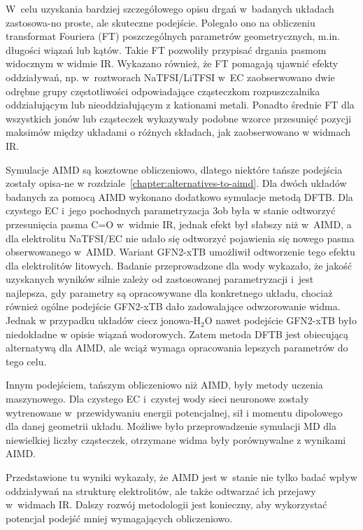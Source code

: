 W~celu uzyskania bardziej szczegółowego opisu drgań w~badanych układach zastosowa-no proste, ale skuteczne podejście. Polegało ono na obliczeniu transformat Fouriera (FT) poszczególnych parametrów geometrycznych, m.in. długości wiązań lub kątów. Takie FT pozwoliły przypisać drgania pasmom widocznym w widmie IR. Wykazano również, że FT pomagają ujawnić efekty oddziaływań, np. w~roztworach NaTFSI/LiTFSI w~EC zaobserwowano dwie odrębne grupy częstotliwości odpowiadające cząsteczkom rozpuszczalnika oddziałującym lub nieoddziałującym z kationami metali. Ponadto średnie FT dla wszystkich jonów lub cząsteczek wykazywały podobne wzorce przesunięć pozycji maksimów między układami o różnych składach, jak zaobserwowano w widmach IR.

Symulacje AIMD są kosztowne obliczeniowo, dlatego niektóre tańsze podejścia zostały opisa-ne w rozdziale~\ref{chapter:alternatives-to-aimd}. Dla dwóch układów badanych za pomocą AIMD wykonano dodatkowo symulacje metodą DFTB. Dla czystego EC i~jego pochodnych parametryzacja 3ob była w stanie odtworzyć przesunięcia pasma C=O w~widmie IR, jednak efekt był słabszy niż w~AIMD, a dla elektrolitu NaTFSI/EC nie udało się odtworzyć pojawienia się nowego pasma obserwowanego w~AIMD. Wariant GFN2-xTB umożliwił odtworzenie tego efektu dla elektrolitów litowych. Badanie przeprowadzone dla wody wykazało, że jakość uzyskanych wyników silnie zależy od zastosowanej parametryzacji i~jest najlepsza, gdy parametry są opracowywane dla konkretnego układu, chociaż również ogólne podejście GFN2-xTB dało zadowalające odwzorowanie widma. Jednak w przypadku układów ciecz jonowa-H$_2$O nawet podejście GFN2-xTB było niedokładne w opisie wiązań wodorowych. Zatem metoda DFTB jest obiecującą alternatywą dla AIMD, ale wciąż wymaga opracowania lepszych parametrów do tego celu.

Innym podejściem, tańszym obliczeniowo niż AIMD, były metody uczenia maszynowego. Dla czystego EC i~czystej wody sieci neuronowe zostały wytrenowane w~przewidywaniu energii potencjalnej, sił i momentu dipolowego dla danej geometrii układu. Możliwe było przeprowadzenie symulacji MD dla niewielkiej liczby cząsteczek, otrzymane widma były porównywalne z wynikami AIMD.

Przedstawione tu wyniki wykazały, że AIMD jest w~stanie nie tylko badać wpływ oddziaływań na strukturę elektrolitów, ale także odtwarzać ich przejawy w~widmach IR. Dalszy rozwój metodologii jest konieczny, aby wykorzystać potencjał podejść mniej wymagających obliczeniowo.
